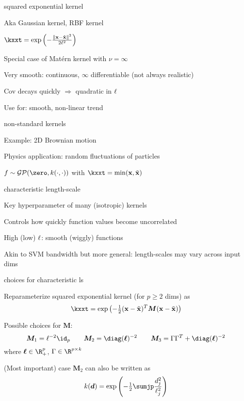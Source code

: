 \documentclass[11pt,compress,t,notes=noshow, xcolor=table]{beamer}
\begin{document}
\begin{framei}{squared exponential kernel}
\item Aka Gaussian kernel, RBF kernel
\item $\kxxt = \exp \left(-\frac{\xxtnorm^2}{2\ls^2} \right)$
\item Special case of Matérn kernel with $\nu = \infty$
\item Very smooth: continuous, $\infty$ differentiable (not always realistic)
\item Cov decays quickly $\Rightarrow$ quadratic in $\ell$
\item Use for: smooth, non-linear trend
\end{framei}

\begin{framei}[sep=S]{non-standard kernels}
\item Example: 2D Brownian motion
\item Physics application: random fluctuations of particles
\item $f \sim \GPzk$ with $ \kxxt = \min (\xv, \xtil)$
\vfill
{}
\end{framei}

\begin{framei}[sep=L]{characteristic length-scale}
\item Key hyperparameter of many (isotropic) kernels
\item Controls how quickly function values become uncorrelated
\item High (low) $\ell$: smooth (wiggly) functions
\vfill
{}
\item Akin to SVM bandwidth but more general: length-scales may vary across input dims
\end{framei}

\begin{framei}[sep=L]{choices for characteristic ls}
\item Reparameterize squared exponential kernel (for $p \geq 2$ dims) as
$$
\kxxt = \exp \left(- \tfrac{1}{2}(\xv - \xtil)^T\bm{M} (\xv - \xtil )\right)
$$
\item Possible choices for $\bm{M}$:
$$
\bm{M}_1 = \ls^{-2}\id_p \qquad \bm{M}_2 = \diag(\bm{\ls})^{-2} \qquad \bm{M}_3 = \Gamma \Gamma^T + \diag(\bm{\ls})^{-2}
$$
where $\bm{\ls} \in \R^p_+$, $\Gamma \in \R^{p \times k}$ 
\item (Most important) case $\bm{M}_2$ can also be written as
$$
  k(\bm{d}) = \exp \left(- \tfrac{1}{2} \sumjp \frac{d_j^2}{\ell_j^2} \right)
$$
\end{framei}
\end{document}
